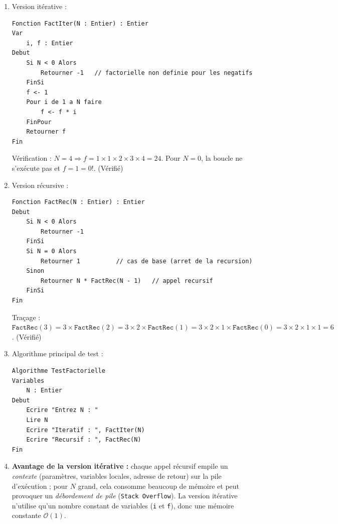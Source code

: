\documentclass[11pt]{article}
\newcommand{\cle}[1]{{\popxbold\color{popdark}#1}}
\begin{document}
\begin{corrige}
\begin{enumerate}
    \item Version itérative :
\begin{lstlisting}
Fonction FactIter(N : Entier) : Entier
Var
    i, f : Entier
Debut
    Si N < 0 Alors
        Retourner -1   // factorielle non definie pour les negatifs
    FinSi
    f <- 1
    Pour i de 1 a N faire
        f <- f * i
    FinPour
    Retourner f
Fin
\end{lstlisting}
    Vérification : $N = 4 \Rightarrow f = 1 \times 1 \times 2 \times 3 \times 4 = 24$. Pour $N = 0$, la boucle ne s'exécute pas et $f = 1 = 0!$. (Vérifié)
    \item Version récursive :
\begin{lstlisting}
Fonction FactRec(N : Entier) : Entier
Debut
    Si N < 0 Alors
        Retourner -1
    FinSi
    Si N = 0 Alors
        Retourner 1          // cas de base (arret de la recursion)
    Sinon
        Retourner N * FactRec(N - 1)   // appel recursif
    FinSi
Fin
\end{lstlisting}
    Traçage : $\texttt{FactRec}(3) = 3 \times \texttt{FactRec}(2) = 3 \times 2 \times \texttt{FactRec}(1) = 3 \times 2 \times 1 \times \texttt{FactRec}(0) = 3 \times 2 \times 1 \times 1 = 6$. (Vérifié)
    \item Algorithme principal de test :
\begin{lstlisting}
Algorithme TestFactorielle
Variables
    N : Entier
Debut
    Ecrire "Entrez N : "
    Lire N
    Ecrire "Iteratif : ", FactIter(N)
    Ecrire "Recursif : ", FactRec(N)
Fin
\end{lstlisting}
    \item \textbf{Avantage de la version itérative :} chaque appel récursif empile un \emph{contexte} (paramètres, variables locales, adresse de retour) sur la \cle{pile d'exécution} ; pour $N$ grand, cela consomme beaucoup de mémoire et peut provoquer un \emph{débordement de pile} (\texttt{Stack Overflow}). La version itérative n'utilise qu'un nombre constant de variables (\texttt{i} et \texttt{f}), donc une mémoire constante $\mathcal{O}(1)$.
\end{enumerate}
\end{corrige}
\end{document}
